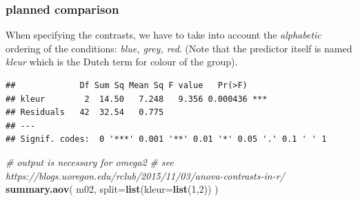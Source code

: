 \documentclass[
]{book}
\newenvironment{Shaded}{\begin{snugshade}}{\end{snugshade}}
\newcommand{\AttributeTok}[1]{\textcolor[rgb]{0.13,0.29,0.53}{#1}}
\newcommand{\CommentTok}[1]{\textcolor[rgb]{0.56,0.35,0.01}{\textit{#1}}}
\newcommand{\DecValTok}[1]{\textcolor[rgb]{0.00,0.00,0.81}{#1}}
\newcommand{\FunctionTok}[1]{\textcolor[rgb]{0.13,0.29,0.53}{\textbf{#1}}}
\newcommand{\NormalTok}[1]{#1}
\newcommand{\OtherTok}[1]{\textcolor[rgb]{0.56,0.35,0.01}{#1}}
\newcommand{\SpecialCharTok}[1]{\textcolor[rgb]{0.81,0.36,0.00}{\textbf{#1}}}
\newcommand{\StringTok}[1]{\textcolor[rgb]{0.31,0.60,0.02}{#1}}
\begin{document}
\subsubsection{planned comparison}\label{planned-comparison-2}

When specifying the contrasts, we have to take into account the
\emph{alphabetic} ordering of the conditions: \emph{blue, grey, red}.
(Note that the predictor itself is named \emph{kleur} which is the Dutch term for colour of the group).

\begin{Shaded}
\end{Shaded}

\begin{verbatim}
##             Df Sum Sq Mean Sq F value   Pr(>F)    
## kleur        2  14.50   7.248   9.356 0.000436 ***
## Residuals   42  32.54   0.775                     
## ---
## Signif. codes:  0 '***' 0.001 '**' 0.01 '*' 0.05 '.' 0.1 ' ' 1
\end{verbatim}

\begin{Shaded}
\begin{Highlighting}[]
\CommentTok{\# output is necessary for omega2}
\CommentTok{\# see https://blogs.uoregon.edu/rclub/2015/11/03/anova{-}contrasts{-}in{-}r/}
\FunctionTok{summary.aov}\NormalTok{( m02, }\AttributeTok{split=}\FunctionTok{list}\NormalTok{(}\AttributeTok{kleur=}\FunctionTok{list}\NormalTok{(}\DecValTok{1}\NormalTok{,}\DecValTok{2}\NormalTok{)) )}
\end{Highlighting}
\end{Shaded}
\end{document}
